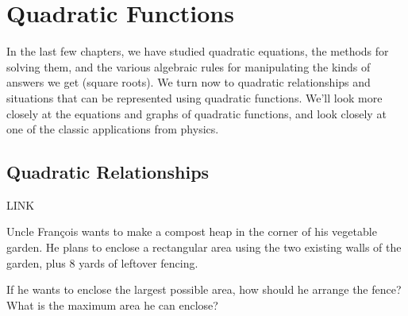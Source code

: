 \chapter{Quadratic Functions}
\label{ch:quadfunc}


In the last few chapters, we have studied quadratic equations, the methods for solving them, and the various algebraic rules for manipulating the kinds of answers we get (square roots). We turn now to quadratic relationships and situations that can be represented using quadratic functions. We'll look more closely at the equations and graphs of quadratic functions, and look closely at one of the classic applications from physics.

\section{Quadratic Relationships}
\label{sec:quadrelationships}

\begin{boxedexplore}
LINK
\end{boxedexplore}

\begin{boxedexplore}
Uncle Fran\c{c}ois wants to make a compost heap in the corner of his vegetable garden. He plans to enclose a rectangular area using the two existing walls of the garden, plus 8 yards of leftover fencing.

\begin{center}
\end{center}

If he wants to enclose the largest possible area, how should he arrange the fence? What is the maximum area he can enclose?
\end{boxedexplore}


